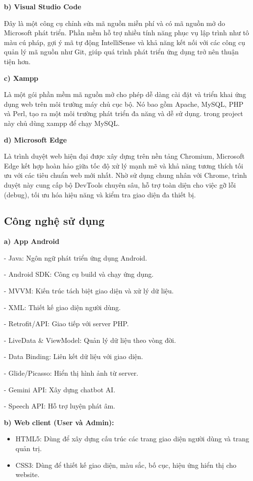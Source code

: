 \noindent\textbf{b) Visual Studio Code}


Đây là một công cụ chỉnh sửa mã nguồn miễn phí và có mã nguồn mở do Microsoft phát triển. Phần mềm hỗ trợ nhiều tính năng phục vụ lập trình như tô màu cú pháp, gợi ý mã tự động IntelliSense và khả năng kết nối với các công cụ quản lý mã nguồn như Git, giúp quá trình phát triển ứng dụng trở nên thuận tiện hơn.


\noindent\textbf{c) Xampp}


Là một gói phần mềm mã nguồn mở cho phép dễ dàng cài đặt và triển khai ứng dụng web trên môi trường máy chủ cục bộ. Nó bao gồm Apache, MySQL, PHP và Perl, tạo ra một môi trường phát triển đa năng và dễ sử dụng. trong project này chủ dùng xampp để chạy MySQL.


\noindent\textbf{d) Microsoft Edge}


Là trình duyệt web hiện đại được xây dựng trên nền tảng Chromium, Microsoft Edge kết hợp hoàn hảo giữa tốc độ xử lý mạnh mẽ và khả năng tương thích tối ưu với các tiêu chuẩn web mới nhất. Nhờ sử dụng chung nhân với Chrome, trình duyệt này cung cấp bộ DevTools chuyên sâu, hỗ trợ toàn diện cho việc gỡ lỗi (debug), tối ưu hóa hiệu năng và kiểm tra giao diện đa thiết bị.


\subsection{Công nghệ sử dụng}

\noindent\textbf{a) App Android}


- Java: Ngôn ngữ phát triển ứng dụng Android.


- Android SDK: Công cụ build và chạy ứng dụng.


- MVVM: Kiến trúc tách biệt giao diện và xử lý dữ liệu.


- XML: Thiết kế giao diện người dùng.


- Retrofit/API: Giao tiếp với server PHP.


- LiveData \& ViewModel: Quản lý dữ liệu theo vòng đời.


- Data Binding: Liên kết dữ liệu với giao diện.


- Glide/Picasso: Hiển thị hình ảnh từ server.


- Gemini API: Xây dựng chatbot AI.


- Speech API: Hỗ trợ luyện phát âm.


\noindent\textbf{b) Web client (User và Admin):}


\begin{itemize}
\item HTML5: Dùng để xây dựng cấu trúc các trang giao diện người dùng và trang quản trị.
\item CSS3: Dùng để thiết kế giao diện, màu sắc, bố cục, hiệu ứng hiển thị cho website.
\end{itemize}

